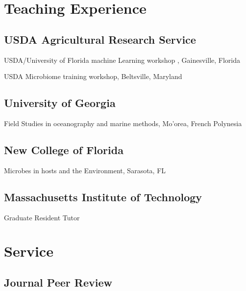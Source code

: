 \documentclass[12pt,letterpaper]{report}
\newcommand{\listitemspace}{0.15em}
\renewenvironment{itemize}
{\begin{list}{}{\setlength{\leftmargin}{0em}
            \setlength{\parskip}{0em}
            \setlength{\itemsep}{\listitemspace}
            \setlength{\parsep}{\listitemspace}}}
    {\end{list}}
\begin{document}
    \section*{Teaching Experience}

    \subsection*{USDA Agricultural Research Service}  
    \begin{itemize} 	
    	\item USDA/University of Florida machine Learning workshop , Gainesville, Florida
    	\item USDA Microbiome training workshop, Beltsville, Maryland
	\end{itemize}
    	
    \subsection*{University of Georgia}
        \begin{itemize}
    	\item Field Studies in oceanography and marine methods, Mo'orea, French Polynesia
	\end{itemize}

    \subsection*{New College of Florida}
            \begin{itemize}
    	\item Microbes in hosts and the Environment, Sarasota, FL
	\end{itemize}

    \subsection*{Massachusetts Institute of Technology}
            \begin{itemize}
    	\item Graduate Resident Tutor
	\end{itemize}


    \section*{Service}

    \subsection*{Journal Peer Review}
\end{document}
